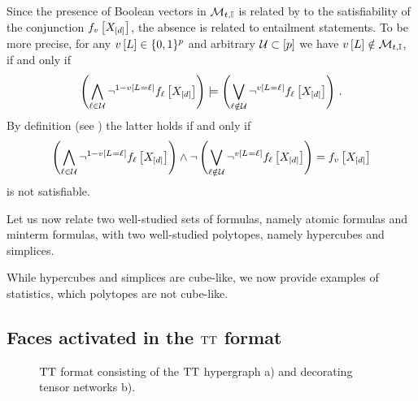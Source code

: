 Since the presence of Boolean vectors in $\mathcal{M}_{t,\mathbb{I}}$ is related by  to the satisfiability of the conjunction $ f_{v}\left[X_{[d]}\right]$, the absence is related to entailment statements.
To be more precise, for any $v\left[L\right]\in\{0,1\}^{p}$ and arbitrary $\mathcal{U}\subset[p]$ we have $v\left[L\right]\notin\mathcal{M}_{t,\mathbb{I}}$, if and only if
\begin{align*}
    \left(\bigwedge_{\ell\in\mathcal{U}} \lnot^{1-v\left[L_{}=\ell_{}\right]} f_{\ell}\left[X_{[d]}\right] \right)
    \models \left(\bigvee_{\ell\notin\mathcal{U}}\lnot^{v\left[L_{}=\ell_{}\right]} f_{\ell}\left[X_{[d]}\right] \right) \, .
\end{align*}
By definition (see \cite{russell_artificial_2021}) the latter holds if and only if
\begin{align*}
    \left(\bigwedge_{\ell\in\mathcal{U}} \lnot^{1-v\left[L_{}=\ell_{}\right]} f_{\ell}\left[X_{[d]}\right] \right)
    \land \lnot \left(\bigvee_{\ell\notin\mathcal{U}}\lnot^{v\left[L_{}=\ell_{}\right]} f_{\ell}\left[X_{[d]}\right] \right)
    = f_{v}\left[X_{[d]}\right]
\end{align*}
is not satisfiable.

Let us now relate two well-studied sets of formulas, namely atomic formulas and minterm formulas, with two well-studied polytopes, namely hypercubes and simplices.





While hypercubes and simplices are cube-like, we now provide examples of statistics, which polytopes are not cube-like.



\subsection{Faces activated in the $\mathrm{TT}$ format}

\begin{figure}
    
    \caption{
        $\mathrm{TT}$ format consisting of the $\mathrm{TT}$ hypergraph a) and decorating tensor networks b).
    }\label{fig:ttFormat}
\end{figure}

